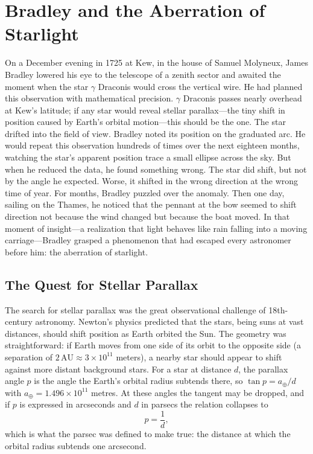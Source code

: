 \chapter{Bradley and the Aberration of Starlight}
\label{ch:bradley-aberration}

On a December evening in 1725 at Kew, in the house of Samuel Molyneux, James Bradley lowered his eye to the telescope of a zenith sector and awaited the moment when the star $\gamma$ Draconis would cross the vertical wire. He had planned this observation with mathematical precision. $\gamma$ Draconis passes nearly overhead at Kew's latitude; if any star would reveal stellar parallax—the tiny shift in position caused by Earth's orbital motion—this should be the one. The star drifted into the field of view. Bradley noted its position on the graduated arc. He would repeat this observation hundreds of times over the next eighteen months, watching the star's apparent position trace a small ellipse across the sky. But when he reduced the data, he found something wrong. The star did shift, but not by the angle he expected. Worse, it shifted in the wrong direction at the wrong time of year. For months, Bradley puzzled over the anomaly. Then one day, sailing on the Thames, he noticed that the pennant at the bow seemed to shift direction not because the wind changed but because the boat moved. In that moment of insight—a realization that light behaves like rain falling into a moving carriage—Bradley grasped a phenomenon that had escaped every astronomer before him: the aberration of starlight.

\section{The Quest for Stellar Parallax}

The search for stellar parallax was the great observational challenge of 18th-century astronomy. Newton's physics predicted that the stars, being suns at vast distances, should shift position as Earth orbited the Sun. The geometry was straightforward: if Earth moves from one side of its orbit to the opposite side (a separation of $2 \, \text{AU} \approx 3 \times 10^{11}$ meters), a nearby star should appear to shift against more distant background stars. For a star at distance $d$, the parallax angle $p$ is the angle the Earth's orbital radius subtends there, so $\tan p = a_{\oplus}/d$ with $a_{\oplus} = 1.496 \times 10^{11}$ metres. At these angles the tangent may be dropped, and if $p$ is expressed in arcseconds and $d$ in parsecs the relation collapses to
\[
  p = \frac{1}{d},
\]
which is what the parsec was defined to make true: the distance at which the orbital radius subtends one arcsecond.


